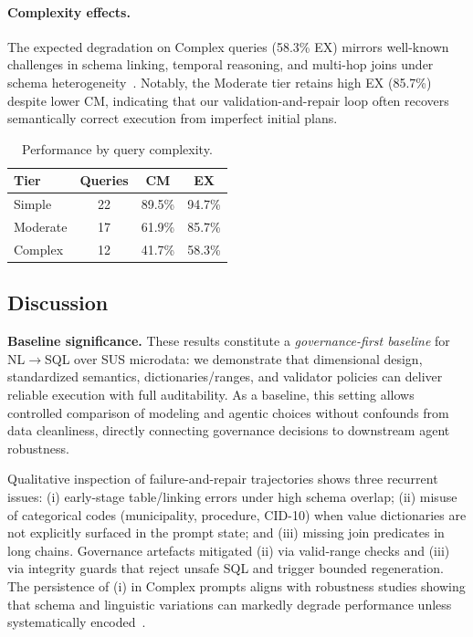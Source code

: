 \documentclass[sigconf,natbib=false]{acmart}
\begin{document}
\paragraph{Complexity effects.}
The expected degradation on Complex queries (58.3\% EX) mirrors well-known challenges in schema linking, temporal reasoning, and multi-hop joins under schema heterogeneity~\cite{hong2024survey,ma2022mtteql,lee2023ehrsql}. Notably, the Moderate tier retains high EX (85.7\%) despite lower CM, indicating that our validation-and-repair loop often recovers semantically correct execution from imperfect initial plans.


\begin{table}[H]
\centering
\caption{Performance by query complexity.}
\label{tab:complexity}
\begin{tabular}{lccc}
\toprule
\textbf{Tier} & \textbf{Queries} & \textbf{CM} & \textbf{EX} \\
\midrule
Simple & 22 & 89.5\% & 94.7\% \\
Moderate & 17 & 61.9\% & 85.7\% \\
Complex & 12 & 41.7\% & 58.3\% \\
\bottomrule
\end{tabular}
\end{table}


\subsection{Discussion}

\textbf{Baseline significance.}
These results constitute a \emph{governance-first baseline} for NL$\rightarrow$SQL over SUS microdata: we demonstrate that dimensional design, standardized semantics, dictionaries/ranges, and validator policies can deliver reliable execution with full auditability. As a baseline, this setting allows controlled comparison of modeling and agentic choices without confounds from data cleanliness, directly connecting governance decisions to downstream agent robustness.

Qualitative inspection of failure-and-repair trajectories shows three recurrent issues: (i) early-stage table/linking errors under high schema overlap; (ii) misuse of categorical codes (municipality, procedure, CID-10) when value dictionaries are not explicitly surfaced in the prompt state; and (iii) missing join predicates in long chains. Governance artefacts mitigated (ii) via valid-range checks and (iii) via integrity guards that reject unsafe SQL and trigger bounded regeneration. The persistence of (i) in Complex prompts aligns with robustness studies showing that schema and linguistic variations can markedly degrade performance unless systematically encoded~\cite{ma2022mtteql,hong2024survey}.
\end{document}
